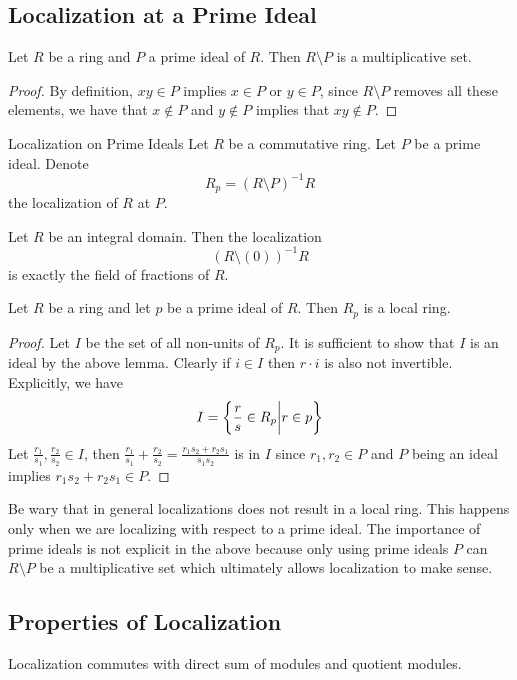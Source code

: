\documentclass[a4paper]{article}
\begin{document}
\subsection{Localization at a Prime Ideal}
\begin{lmm}{}{} Let $R$ be a ring and $P$ a prime ideal of $R$. Then $R\setminus P$ is a multiplicative set. \tcbline
\begin{proof}
By definition, $xy\in P$ implies $x\in P$ or $y\in P$, since $R\setminus P$ removes all these elements, we have that $x\notin P$ and $y\notin P$ implies that $xy\notin P$. 
\end{proof}
\end{lmm}

\begin{defn}{Localization on Prime Ideals}{} Let $R$ be a commutative ring. Let $P$ be a prime ideal. Denote $$R_p=(R\setminus P)^{-1}R$$ the localization of $R$ at $P$. 
\end{defn}

\begin{lmm}{}{} Let $R$ be an integral domain. Then the localization $$(R\setminus(0))^{-1}R$$ is exactly the field of fractions of $R$. 
\end{lmm}

\begin{prp}{}{} Let $R$ be a ring and let $p$ be a prime ideal of $R$. Then $R_p$ is a local ring. \tcbline
\begin{proof}
Let $I$ be the set of all non-units of $R_p$. It is sufficient to show that $I$ is an ideal by the above lemma. Clearly if $i\in I$ then $r\cdot i$ is also not invertible. Explicitly, we have $$I=\left\{\frac{r}{s}\in R_p\bigg{|}r\in p\right\}$$ Let $\frac{r_1}{s_1},\frac{r_2}{s_2}\in I$, then $\frac{r_1}{s_1}+\frac{r_2}{s_2}=\frac{r_1s_2+r_2s_1}{s_1s_2}$ is in $I$ since $r_1,r_2\in P$ and $P$ being an ideal implies $r_1s_2+r_2s_1\in P$. 
\end{proof}
\end{prp}

Be wary that in general localizations does not result in a local ring. This happens only when we are localizing with respect to a prime ideal. The importance of prime ideals is not explicit in the above because only using prime ideals $P$ can $R\setminus P$ be a multiplicative set which ultimately allows localization to make sense. 

\subsection{Properties of Localization}
\begin{prp}{}{} Localization commutes with direct sum of modules and quotient modules. 
\end{prp}
\end{document}
